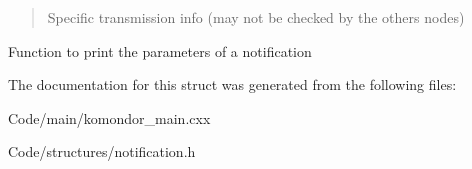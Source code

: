 \begin{quote}
Specific transmission info (may not be checked by the others nodes) \end{quote}


Function to print the parameters of a notification 

The documentation for this struct was generated from the following files\+:\begin{DoxyCompactItemize}
\item 
Code/main/komondor\+\_\+main.\+cxx\item 
Code/structures/notification.\+h\end{DoxyCompactItemize}
